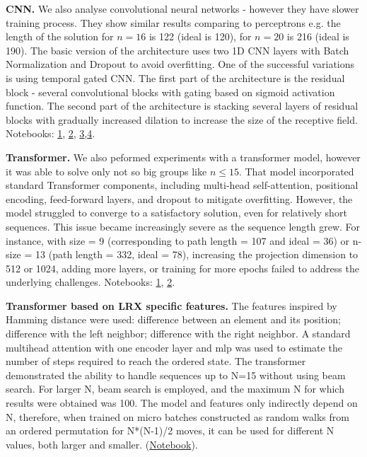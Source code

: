 \documentclass[atmp]{ipart_v1}
\numberwithin{equation}{section}
\theoremstyle{plain}%
\begin{document}
{\bf CNN.}
We also analyse convolutional neural networks - however they have  slower training process.  They show similar  results comparing to perceptrons
e.g. the length of the solution for $n=16$ is 122 (ideal is 120), for $n=20$ is 216 (ideal is 190). The basic version of the architecture uses two 1D CNN layers with Batch Normalization and Dropout to avoid overfitting. One of the successful variations is using temporal gated CNN. The first part of the architecture is the residual block - several convolutional blocks with gating based on sigmoid activation function. The second part of the architecture is stacking several layers of residual blocks with gradually increased dilation to increase the size of the receptive field.
Notebooks: \href{https://www.kaggle.com/code/artgor/encoding-as-permutation-matrix-1d-cnn}{1}, \href{https://www.kaggle.com/code/artgor/encoding-as-permutation-mat-simple-2d-cnn}{2}, \href{https://colab.research.google.com/drive/1oWuQg33bveHYqVET4IES_EWIH1nsa4yi}{3},\href{https://colab.research.google.com/drive/1oWuQg33bveHYqVET4IES_EWIH1nsa4yi}{4}.

{\bf Transformer.} We also peformed experiments with a transformer model, however it was able to solve only not so big groups like $n\le 15$. 
That model incorporated standard Transformer components, including multi-head self-attention, positional encoding, feed-forward layers, and dropout to mitigate overfitting. However, the model struggled to converge to a satisfactory solution, even for relatively short sequences. This issue became increasingly severe as the sequence length grew. For instance, with size = 9 (corresponding to path length = 107 and ideal = 36) or n-size = 13 (path length = 332, ideal = 78), increasing the projection dimension to 512 or 1024, adding more layers, or training for more epochs failed to address the underlying challenges. Notebooks: \href{https://www.kaggle.com/code/nursmen/lrx-transformer-training}{1}, \href{https://www.kaggle.com/code/nursmen/lrx-transformer-use}{2}.


{\bf Transformer based on LRX specific features.}
The features inspired by Hamming distance were used:  difference between an element and its position;  difference with the left neighbor;  difference with the right neighbor.  A standard multihead attention with one encoder layer and mlp was used to estimate the number of steps required to reach the ordered state. The transformer demonstrated the ability to handle sequences up to N=15 without using beam search. For larger N, beam search is employed, and the maximum N for which results were obtained was 100. The model and features only indirectly depend on N, therefore, when trained on micro batches constructed as random walks from an ordered permutation for N*(N-1)/2 moves, it can be used for different N values, both larger and smaller.  (\href{https://www.kaggle.com/code/sergeifironov/permutation-transformer-solver-100}{Notebook}). 
\end{document}
